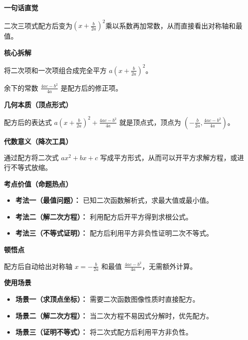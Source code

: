 \begin{explanationbox}
	\textbf{\textcolor{CExplanation}{一句话直觉}}

	二次三项式配方后变为$(x+\frac{b}{2a})^2$乘以系数再加常数，从而直接看出对称轴和最值。

	\medskip
	\textbf{\textcolor{CExplanation}{核心拆解}}
	\begin{description}[style=nextline, leftmargin=2.8em, labelsep=0.5em, itemsep=0.45em]
		\item[\textbf{要点一（配方结构）：}] 将二次项和一次项组合成完全平方 $a(x+\frac{b}{2a})^2$。
		\item[\textbf{要点二（常数分离）：}] 余下的常数 $\frac{4ac-b^2}{4a}$ 是配方后的修正项。
	\end{description}

	\medskip
	\textbf{\textcolor{CExplanation}{几何本质（顶点形式）}}

	配方后的表达式 $a(x+\frac{b}{2a})^2 + \frac{4ac-b^2}{4a}$ 就是顶点式，顶点为 $(-\frac{b}{2a},\frac{4ac-b^2}{4a})$。

	\medskip
	\textbf{\textcolor{CExplanation}{代数意义（降次工具）}}

	通过配方将二次式 $ax^2+bx+c$ 写成平方形式，从而可以开平方求解方程，或进行不等式放缩。

	\medskip
	\textbf{\textcolor{CExplanation}{考点价值（命题热点）}}
	\begin{itemize}[leftmargin=*, itemsep=0.5em, topsep=0.4em]
		\item \textbf{考法一（最值问题）：} 已知二次函数解析式，求最大值或最小值。
		\item \textbf{考法二（解二次方程）：} 利用配方后开平方得到求根公式。
		\item \textbf{考法三（不等式证明）：} 配方后利用平方非负性证明二次不等式。
	\end{itemize}

	\medskip
	\textbf{\textcolor{CExplanation}{顿悟点}}

	配方后自动给出对称轴 $x=-\frac{b}{2a}$ 和最值 $\frac{4ac-b^2}{4a}$，无需额外计算。

	\medskip
	\textbf{\textcolor{CExplanation}{使用场景}}
	\begin{itemize}[leftmargin=*, itemsep=0.5em, topsep=0.4em]
		\item \textbf{场景一（求顶点坐标）：} 需要二次函数图像性质时直接配方。
		\item \textbf{场景二（解二次方程）：} 当二次方程不易因式分解时，优先配方。
		\item \textbf{场景三（证明不等式）：} 将二次式配方后利用平方非负性。
	\end{itemize}
\end{explanationbox}
